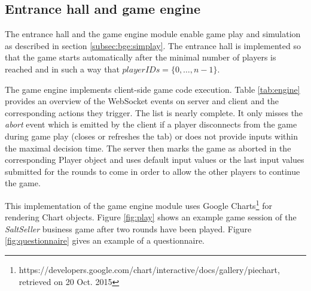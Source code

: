 \subsection{Entrance hall and game engine}
\label{sub:module:engine}

The entrance hall and the game engine module enable game play and simulation as described in section \ref{subsec:bge:simplay}. The entrance hall is implemented so that the game starts automatically after the minimal number of players is reached and in such a way that $playerIDs = \{0,\dots, n-1\}$.

The game engine implements client-side game code execution. Table \ref{tab:engine} provides an overview of the WebSocket events on server and client and the corresponding actions they trigger. The list is nearly complete. It only misses the \textit{abort} event which is emitted by the client if a player disconnects from the game during game play (closes or refreshes the tab) or does not provide inputs within the maximal decision time. The server then marks the game as aborted in the corresponding Player object and uses default input values or the last input values submitted for the rounds to come in order to allow the other players to continue the game.

This implementation of the game engine module uses Google Charts\footnote{https://developers.google.com/chart/interactive/docs/gallery/piechart, retrieved on 20 Oct. 2015} for rendering Chart objects. Figure \ref{fig:play} shows an example game session of the \textit{SaltSeller} business game after two rounds have been played. Figure \ref{fig:questionnaire} gives an example of a questionnaire.


